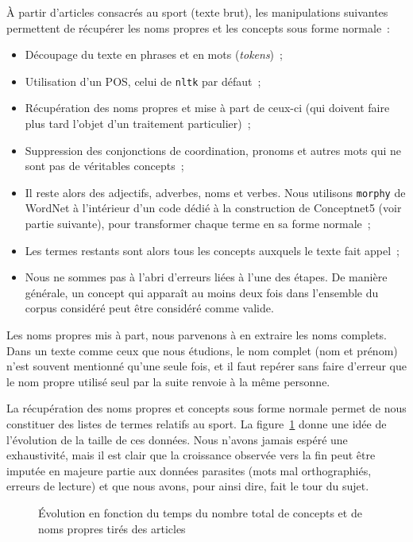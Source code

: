 \documentclass[a4paper, 12pt]{article}
\newcommand{\pyt}[1]{\texttt{#1}}%
\begin{document}
\`A partir d'articles consacrés au sport (texte brut), les manipulations suivantes permettent de récupérer les noms propres et les concepts sous forme normale~:
\begin{itemize}
 \item Découpage du texte en phrases et en mots (\textit{tokens})~;
 \item Utilisation d'un POS, celui de \pyt{nltk} par défaut~;
 \item Récupération des noms propres et mise à part de ceux-ci (qui doivent faire plus tard l'objet d'un traitement particulier)~;
 \item Suppression des conjonctions de coordination, pronoms et autres mots qui ne sont pas de véritables concepts~;
 \item Il reste alors des adjectifs, adverbes, noms et verbes. Nous utilisons \pyt{morphy} de WordNet à l'intérieur d'un code dédié à la construction de Conceptnet5 (voir partie suivante), pour transformer chaque terme en sa forme normale~;
 \item Les termes restants sont alors tous les concepts auxquels le texte fait appel~;
 \item Nous ne sommes pas à l'abri d'erreurs liées à l'une des étapes. De manière générale, un concept qui apparaît au moins deux fois dans l'ensemble du corpus considéré peut être considéré comme valide.
\end{itemize}

Les noms propres mis à part, nous parvenons à en extraire les noms complets. Dans un texte comme ceux que nous étudions, le nom complet (nom et prénom) n'est souvent mentionné qu'une seule fois, et il faut repérer sans faire d'erreur que le nom propre utilisé seul par la suite renvoie à la même personne.

La récupération des noms propres et concepts sous forme normale permet de nous constituer des listes de termes relatifs au sport. La figure~\ref{fig:conceptsnoms} donne une idée de l'évolution de la taille de ces données. Nous n'avons jamais espéré une exhaustivité, mais il est clair que la croissance observée vers la fin peut être imputée en majeure partie aux données parasites (mots mal orthographiés, erreurs de lecture) et que nous avons, pour ainsi dire, fait le tour du sujet.


\begin{figure}[h]
 \centering
 \caption{\label{fig:conceptsnoms}Évolution en fonction du temps du nombre total de concepts et de noms propres tirés des articles}
\end{figure}
\end{document}
